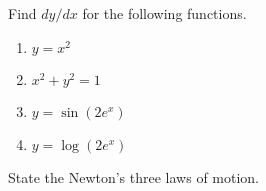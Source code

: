 \begin{problems}
  \item Find $dy/dx$ for the following functions.
  \begin{enumerate}
    \item $y=x^2$
    \item $x^{2}+y^{2}=1$
    \item $y=\sin(2e^x)$
    \item $y=\log(2e^x)$
  \end{enumerate}
  \item State the Newton's three laws of motion.
\end{problems}
